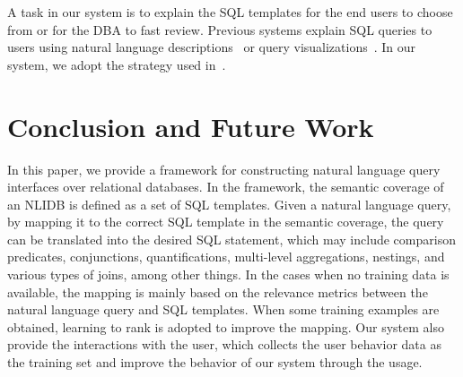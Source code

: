 \documentclass{vldb}
\begin{document}
A task in our system is to explain the SQL templates for the end users to choose from or for the DBA to fast review.  Previous systems explain SQL queries to users using natural language descriptions~\cite{DBLP:conf/sigmod/KokkalisVZSKI12} or query visualizations~\cite{DBLP:conf/edbt/DanaparamitaG11,DBLP:conf/icde/FanLZ11,DBLP:journals/pvldb/BergamaschiGILV13}.  In our system, we adopt the strategy used in~\cite{DBLP:conf/sigmod/KokkalisVZSKI12}.  

\section{Conclusion and Future Work}
\label{sec:conclusion}

In this paper, we provide a framework for constructing natural language query interfaces over relational databases.  In the framework, the semantic coverage of an NLIDB is defined as a set of SQL templates.  Given a natural language query, by mapping it to the correct SQL template in the semantic coverage, the query can be translated into the desired SQL statement, which may include comparison predicates, conjunctions, quantifications, multi-level aggregations, nestings, and various types of joins, among other things.  In the cases when no training data is available, the mapping is mainly based on the relevance metrics between the natural language query and SQL templates.  When some training examples are obtained, learning to rank is adopted to improve the mapping.  Our system also provide the interactions with the user, which collects the user behavior data as the training set and improve the behavior of our system through the usage.



\end{document}
